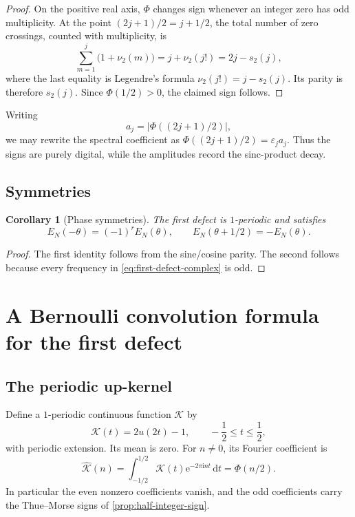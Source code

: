 \documentclass[11pt]{article}
\numberwithin{equation}{section}
\newtheorem{corollary}[theorem]{Corollary}
\theoremstyle{definition}
\theoremstyle{remark}
\newcommand{\eps}{\varepsilon}
\newcommand{\dd}{\,\mathrm d}
\newcommand{\e}{\mathrm e}
\newcommand{\iu}{\mathrm i}
\newcommand{\abs}[1]{\left|#1\right|}
\newcommand{\Kcal}{\mathcal K}
\begin{document}
\begin{proof}
On the positive real axis, $\Phi$ changes sign whenever an integer zero has odd multiplicity.  At the point $(2j+1)/2=j+1/2$, the total number of zero crossings, counted with multiplicity, is
\[
 \sum_{m=1}^{j}\bigl(1+\nu_2(m)\bigr)
 =j+\nu_2(j!)
 =2j-s_2(j),
\]
where the last equality is Legendre's formula $\nu_2(j!)=j-s_2(j)$.  Its parity is therefore $s_2(j)$.  Since $\Phi(1/2)>0$, the claimed sign follows.
\end{proof}

Writing
\begin{equation}
 a_j=\abs{\Phi((2j+1)/2)},
 \label{eq:half-amplitudes}
\end{equation}
we may rewrite the spectral coefficient as $\Phi((2j+1)/2)=\eps_ja_j$.  Thus the signs are purely digital, while the amplitudes record the sinc-product decay.

\subsection{Symmetries}

\begin{corollary}[Phase symmetries]
\label{cor:defect-symmetries}
The first defect is $1$-periodic and satisfies
\begin{equation}
 E_N(-\theta)=(-1)^rE_N(\theta),
 \qquad
 E_N(\theta+1/2)=-E_N(\theta).
 \label{eq:defect-symmetries}
\end{equation}
\end{corollary}

\begin{proof}
The first identity follows from the sine/cosine parity.  The second follows because every frequency in \eqref{eq:first-defect-complex} is odd.
\end{proof}

\section{A Bernoulli convolution formula for the first defect}
\label{sec:bernoulli-kernel}

\subsection{The periodic up-kernel}

Define a $1$-periodic continuous function $\Kcal$ by
\begin{equation}
 \Kcal(t)=2u(2t)-1,
 \qquad -\frac12\le t\le\frac12,
 \label{eq:K-kernel}
\end{equation}
with periodic extension.  Its mean is zero.  For $n\ne0$, its Fourier coefficient is
\begin{equation}
 \widehat{\Kcal}(n)
 =\int_{-1/2}^{1/2}\Kcal(t)\e^{-2\pi\iu nt}\dd t
 =\Phi(n/2).
 \label{eq:K-Fourier}
\end{equation}
In particular the even nonzero coefficients vanish, and the odd coefficients carry the Thue--Morse signs of \cref{prop:half-integer-sign}.
\end{document}

